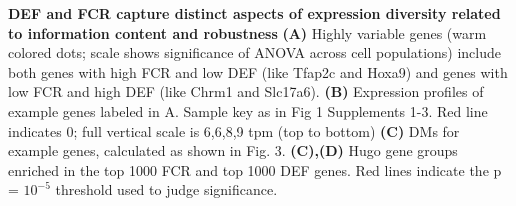 \textbf{DEF and FCR capture distinct aspects of expression diversity related to information content and robustness} \textbf{(A)} Highly variable genes (warm colored dots; scale shows significance of ANOVA across cell populations) include both genes with high FCR and low DEF (like Tfap2c and Hoxa9) and genes with low FCR and high DEF (like Chrm1 and Slc17a6). \textbf{(B)} Expression profiles of example genes labeled in A. Sample key as in Fig 1 Supplements 1-3. Red line indicates 0; full vertical scale is 6,6,8,9 tpm (top to bottom) \textbf{(C)} DMs for example genes, calculated as shown in Fig. 3. \textbf{(C),(D)} Hugo gene groups enriched in the top 1000 FCR and top 1000 DEF genes. Red lines indicate the p = $10^{-5}$ threshold used to judge significance.